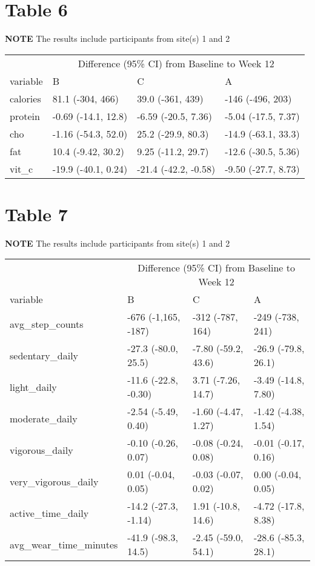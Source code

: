 \documentclass[]{article}
\begin{document}
\hypertarget{table-6}{%
\section{Table 6}\label{table-6}}

\textbf{NOTE} The results include participants from site(s) 1 and 2

\begin{table}[H]
\centering
\begin{tabular}{l|l|l|l}
\hline
\multicolumn{1}{c|}{ } & \multicolumn{3}{c}{Difference (95\% CI) from Baseline to Week 12} \\
\cline{2-4}
variable & B & C & A\\
\hline
calories & 81.1 (-304, 466) & 39.0 (-361, 439) & -146 (-496, 203)\\
\hline
protein & -0.69 (-14.1, 12.8) & -6.59 (-20.5, 7.36) & -5.04 (-17.5, 7.37)\\
\hline
cho & -1.16 (-54.3, 52.0) & 25.2 (-29.9, 80.3) & -14.9 (-63.1, 33.3)\\
\hline
fat & 10.4 (-9.42, 30.2) & 9.25 (-11.2, 29.7) & -12.6 (-30.5, 5.36)\\
\hline
vit\_c & -19.9 (-40.1, 0.24) & -21.4 (-42.2, -0.58) & -9.50 (-27.7, 8.73)\\
\hline
\end{tabular}
\end{table}

\hypertarget{table-7}{%
\section{Table 7}\label{table-7}}

\textbf{NOTE} The results include participants from site(s) 1 and 2

\begin{table}[H]
\centering
\begin{tabular}{l|l|l|l}
\hline
\multicolumn{1}{c|}{ } & \multicolumn{3}{c}{Difference (95\% CI) from Baseline to Week 12} \\
\cline{2-4}
variable & B & C & A\\
\hline
avg\_step\_counts & -676 (-1,165, -187) & -312 (-787, 164) & -249 (-738, 241)\\
\hline
sedentary\_daily & -27.3 (-80.0, 25.5) & -7.80 (-59.2, 43.6) & -26.9 (-79.8, 26.1)\\
\hline
light\_daily & -11.6 (-22.8, -0.30) & 3.71 (-7.26, 14.7) & -3.49 (-14.8, 7.80)\\
\hline
moderate\_daily & -2.54 (-5.49, 0.40) & -1.60 (-4.47, 1.27) & -1.42 (-4.38, 1.54)\\
\hline
vigorous\_daily & -0.10 (-0.26, 0.07) & -0.08 (-0.24, 0.08) & -0.01 (-0.17, 0.16)\\
\hline
very\_vigorous\_daily & 0.01 (-0.04, 0.05) & -0.03 (-0.07, 0.02) & 0.00 (-0.04, 0.05)\\
\hline
active\_time\_daily & -14.2 (-27.3, -1.14) & 1.91 (-10.8, 14.6) & -4.72 (-17.8, 8.38)\\
\hline
avg\_wear\_time\_minutes & -41.9 (-98.3, 14.5) & -2.45 (-59.0, 54.1) & -28.6 (-85.3, 28.1)\\
\hline
\end{tabular}
\end{table}
\end{document}
